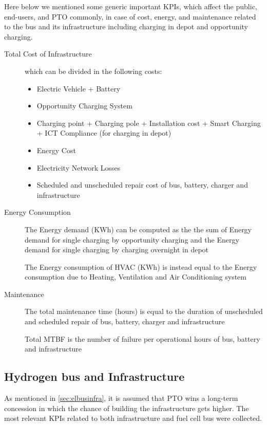 Here below we mentioned some generic important KPIs, which affect the public, end-users, and PTO commonly, in case of cost, energy, and maintenance related to the bus and its infrastructure including charging in depot and opportunity charging.

\begin{description}
    \item [Total Cost of Infrastructure] which can be divided in the following costs:
        \begin{itemize}
            \item Electric Vehicle + Battery
            \item Opportunity Charging System
            \item Charging point + Charging pole + Installation cost + Smart Charging + ICT Compliance (for charging in depot)
            \item Energy Cost
            \item Electricity Network Losses
            \item Scheduled and unscheduled repair cost of bus, battery, charger and infrastructure
        \end{itemize}
    \item [Energy Consumption] The Energy demand (KWh) can be computed as the the sum of Energy demand for single charging by opportunity charging and the Energy demand for single charging by charging overnight in depot
    
    The Energy consumption of HVAC (KWh) is instead equal to the Energy consumption due to Heating, Ventilation and Air Conditioning system
    \item [Maintenance] The total maintenance time (hours) is equal to the duration of unscheduled and scheduled repair of bus, battery, charger and infrastructure
    
    Total MTBF is the number of failure per operational hours of bus, battery and infrastructure
\end{description}


\subsection{Hydrogen bus and Infrastructure}
As mentioned in \ref{sec:elbusinfra}, it is assumed that PTO wins a long-term concession in which the chance of building the infrastructure gets higher. The most relevant KPIs related to both infrastructure and fuel cell bus were collected.


